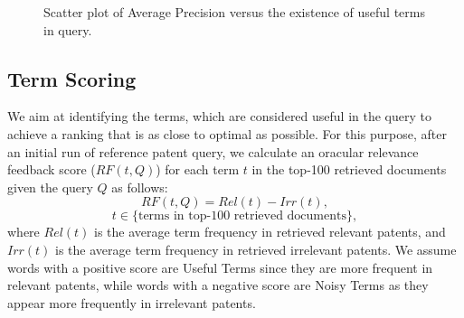 \begin{figure}[t!]
\begin{centering}
 \hspace*{1.5cm} 
\par\end{centering}

\protect\caption{Scatter plot of Average Precision versus the existence of useful terms in query.}
\label{fig:overlap-p}
\end{figure}
\subsection{Term Scoring}
\label{OracularTermSelection}
We aim at identifying the terms, which are considered useful in the query to achieve a ranking that is as close to optimal as possible. For this purpose, 
after an initial run of reference patent query, we
calculate an oracular relevance feedback score ($RF(t,Q)$) for each term $t$ in the top-100
retrieved documents given the query $Q$ as follows:
\begin{equation}
RF(t,Q)=Rel(t)-Irr(t), 
 \label{eq:score}
\end{equation}
\begin{displaymath}t\in \lbrace \mbox{terms in top-100 retrieved documents}\rbrace,\end{displaymath}
where $ \mathit{Rel(t)} $ is the average term frequency in retrieved relevant patents, and $ \mathit{Irr(t)} $ is the average term frequency in retrieved irrelevant patents. We assume words with a positive score are Useful Terms since they are more frequent in relevant patents, while words with a negative score are Noisy Terms as they appear more frequently in irrelevant patents. 

